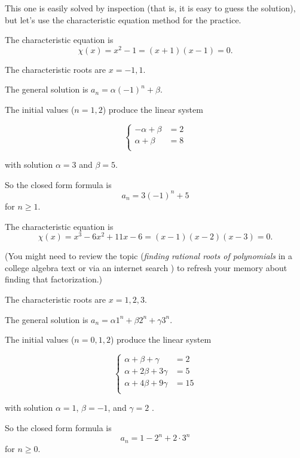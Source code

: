 \begin{Solution}{36.7}

This one is easily solved by inspection (that is, it is easy to guess the solution), but let's
use the characteristic equation method for the practice.

 The characteristic equation is 
\[
\chi(x) = x^{2} -1 = (x+1)(x-1) =0.
\] 

The characteristic roots are $x = -1,1$.

The general solution is $a_{n}=\alpha(-1)^{n} + \beta$.

The initial values ($n = 1,2$)  produce the linear system

\[
  \left\{
    \begin{aligned}
     -\alpha  + \beta &= 2\\
     \alpha + \beta &= 8\\
     \end{aligned}
   \right.
\]
   
with solution $\alpha = 3$ and $\beta = 5$.

So the closed form formula is 
\[
a_{n} = 3(-1)^{n} + 5 
\]   
for $n\geq 1$.

\end{Solution}

\begin{Solution}{36.8}

The characteristic equation is 
\[
\chi(x) = x^{3} - 6x^{2} +11x -6 = (x-1)(x-2)(x-3) =0.
\] 

(You might need to review the topic ({\it finding rational roots of polynomials}
in a college algebra text or via an internet search ) to refresh your memory
about finding that factorization.) 

The characteristic roots are $x = 1,2,3$.

The general solution is $a_{n}=\alpha 1^{n} + \beta 2^{n} + \gamma 3^{n}$.

The initial values ($n = 0,1,2$)  produce the linear system

\[
  \left\{
    \begin{aligned}
     \alpha + \beta+ \gamma &= 2\\
     \alpha + 2\beta  + 3\gamma &= 5\\
     \alpha + 4\beta + 9\gamma  &= 15\\
     \end{aligned}
   \right.
\]
   
with solution $\alpha = 1$, $\beta = -1$, and $\gamma =2$ .

So the closed form formula is 
\[
a_{n} = 1 - 2^{n} + 2\cdot 3^{n}
\]   
for $n\geq 0$.

\end{Solution}

